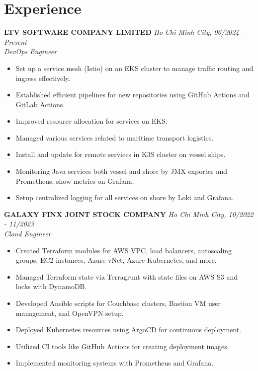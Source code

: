 \documentclass[a4paper,10pt]{article}
\begin{document}
\section*{Experience}
\noindent \textbf{LTV SOFTWARE COMPANY LIMITED} \hfill \textit{Ho Chi Minh City, 06/2024 - Present}  \\
\textit{DevOps Engineer}
\begin{itemize}[leftmargin=0.5in]
    \item Set up a service mesh (Istio) on an EKS cluster to manage traffic routing and ingress effectively.
    \item Established efficient pipelines for new repositories using GitHub Actions and GitLab Actions.
    \item Improved resource allocation for services on EKS.
    \item Managed various services related to maritime transport logistics.
    \item Install and update for remote services in K3S cluster on vessel ships.
    \item Monitoring Java services both vessel and shore by JMX exporter and Prometheus, show metrics on Grafana.
    \item Setup centralized logging for all services on shore by Loki and Grafana.
\end{itemize}

\vspace{10pt}
\noindent \textbf{GALAXY FINX JOINT STOCK COMPANY} \hfill \textit{Ho Chi Minh City, 10/2022 - 11/2023} \\
\textit{Cloud Engineer}
\begin{itemize}[leftmargin=0.5in]
    \item Created Terraform modules for AWS VPC, load balancers, autoscaling groups, EC2 instances, Azure vNet, Azure Kubernetes, and more.
    \item Managed Terraform state via Terragrunt with state files on AWS S3 and locks with DynamoDB.
    \item Developed Ansible scripts for Couchbase clusters, Bastion VM user management, and OpenVPN setup.
    \item Deployed Kubernetes resources using ArgoCD for continuous deployment.
    \item Utilized CI tools like GitHub Actions for creating deployment images.
    \item Implemented monitoring systems with Prometheus and Grafana.
\end{itemize}
\end{document}
